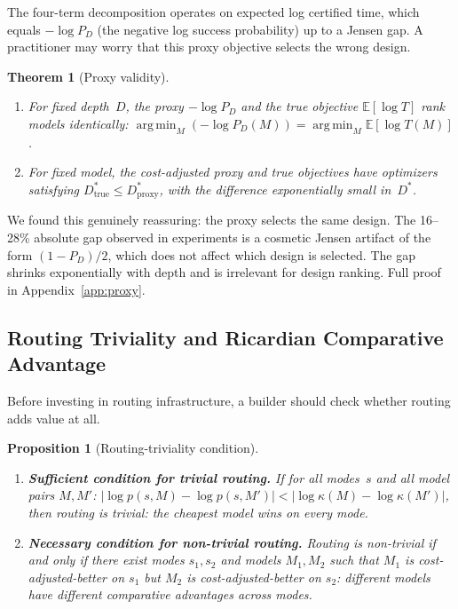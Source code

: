 \documentclass[twoside,11pt]{article}
\newtheorem{theorem}{Theorem}
\newtheorem{proposition}{Proposition}
\newcommand{\E}{\mathbb{E}}
\newcommand{\Dstar}{D^*}
\DeclareMathOperator*{\argmin}{arg\,min}
\newcommand{\appref}[1]{Appendix~\ref{#1}}
\begin{document}
The four-term decomposition operates on expected log certified time, which equals $-\log P_D$ (the negative log success probability) up to a Jensen gap.
A practitioner may worry that this proxy objective selects the wrong design.

\begin{theorem}[Proxy validity]
\label{thm:proxy-validity}
\begin{enumerate}[label=(\alph*)]
  \item For fixed depth~$D$, the proxy $-\log P_D$ and the true objective $\E[\log T]$ rank models identically: $\argmin_M (-\log P_D(M)) = \argmin_M \E[\log T(M)]$.
  \item For fixed model, the cost-adjusted proxy and true objectives have optimizers satisfying $\Dstar_{\mathrm{true}} \le \Dstar_{\mathrm{proxy}}$, with the difference exponentially small in~$\Dstar$.
\end{enumerate}
\end{theorem}

We found this genuinely reassuring: the proxy selects the same design.
The 16--28\% absolute gap observed in experiments is a cosmetic Jensen artifact of the form $(1-P_D)/2$, which does not affect which design is selected.
The gap shrinks exponentially with depth and is irrelevant for design ranking.
Full proof in \appref{app:proxy}.

\subsection{Routing Triviality and Ricardian Comparative Advantage}
\label{sec:routing-triviality}

Before investing in routing infrastructure, a builder should check whether routing adds value at all.

\begin{proposition}[Routing-triviality condition]
\label{prop:routing-triviality}
\begin{enumerate}[label=(\alph*)]
  \item \textbf{Sufficient condition for trivial routing.}
  If for all modes~$s$ and all model pairs $M, M'$:
  $|\log p(s, M) - \log p(s, M')| < |\log \kappa(M) - \log \kappa(M')|$,
  then routing is trivial: the cheapest model wins on every mode.
  \item \textbf{Necessary condition for non-trivial routing.}
  Routing is non-trivial if and only if there exist modes $s_1, s_2$ and models $M_1, M_2$ such that $M_1$ is cost-adjusted-better on $s_1$ but $M_2$ is cost-adjusted-better on $s_2$: different models have different comparative advantages across modes.
\end{enumerate}
\end{proposition}
\end{document}
